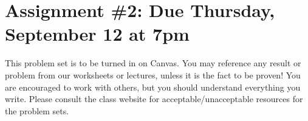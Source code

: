 \documentclass[12pt]{amsart}
\newcommand{\showsol}[1]{\def\displaysol{#1}}
\begin{document}
\showsol{1}
	
	\thispagestyle{empty}
	
	\section*{Assignment \#2: Due Thursday, September 12 at 7pm}
	
	This problem set is to be turned in on Canvas. You may reference any result or problem from our worksheets or lectures, unless it is the fact to be proven! You are encouraged to work with others, but you should understand everything you write. Please consult the class website for acceptable/unacceptable resources for the problem sets.
	
	\
	
	
\end{document}
